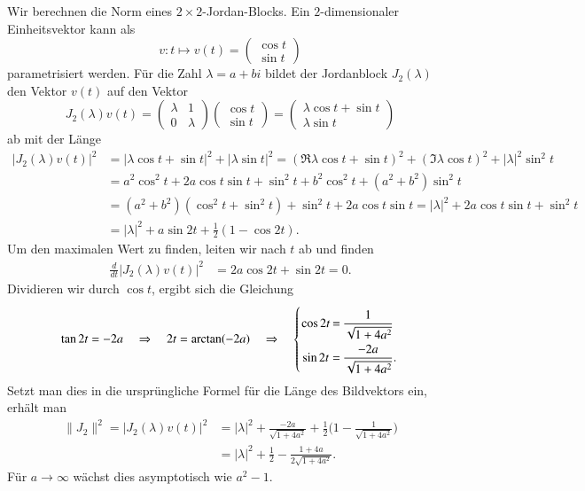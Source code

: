 \begin{beispiel}
Wir berechnen die Norm eines $2\times2$-Jordan-Blocks.
Ein $2$-dimensionaler Einheitsvektor kann als
\[
v\colon
t\mapsto v(t)=
\begin{pmatrix}\cos t\\\sin t\end{pmatrix}
\]
parametrisiert werden.
Für die Zahl $\lambda=a+bi$ bildet der
Jordanblock $J_2(\lambda)$ den Vektor $v(t)$ auf den Vektor
\[
J_2(\lambda)v(t)
=
\begin{pmatrix}
\lambda&1\\
0&\lambda
\end{pmatrix}
\begin{pmatrix}\cos t\\\sin t\end{pmatrix}
=
\begin{pmatrix}
\lambda\cos t + \sin t\\
\lambda\sin t
\end{pmatrix}
\]
ab
mit der Länge
\begin{align*}
|J_2(\lambda)v(t)|^2
&=
|\lambda\cos t + \sin t|^2 + |\lambda\sin t|^2
=
(\Re\lambda \cos t + \sin t)^2
+
(\Im\lambda \cos t)^2
+
|\lambda|^2 \sin^2t
\\
&=
a^2\cos^2 t
+
2a\cos t\sin t + \sin^2 t + b^2\cos^2t + (a^2+b^2) \sin^2 t
\\
&=
(a^2+b^2)(\cos^2t + \sin^2t) + \sin^2t + 2a\cos t\sin t
=
|\lambda|^2+2a\cos t\sin t + \sin^2 t
\\
&=
|\lambda|^2 + a\sin 2t + \frac12(1-\cos 2t).
\end{align*}
Um den maximalen Wert zu finden, leiten wir nach $t$ ab und finden
\begin{align*}
\frac{d}{dt}
|J_2(\lambda)v(t)|^2
&=
2a\cos 2t
+
\sin 2t
=
0.
\end{align*}
Dividieren wir durch $\cos t$, ergibt sich die Gleichung
\[
\tan 2t = -2a
\quad\Rightarrow\quad
2t
=
\arctan(-2a)
\quad\Rightarrow\quad
\left\{
\renewcommand{\arraystretch}{2.1}
\setlength\arraycolsep{1pt}
\begin{array}{ccc}
\cos 2t &=& \displaystyle\frac{1}{\sqrt{1+4a^2}}\phantom{.}\\
\sin 2t &=& \displaystyle\frac{-2a}{\sqrt{1+4a^2}}.
\end{array}
\right.
\]
Setzt man dies in die ursprüngliche Formel für die Länge des
Bildvektors ein, erhält man
\begin{align*}
\|J_2\|^2
=
|J_2(\lambda)v(t)|^2
&=
|\lambda|^2 + \frac{-2a}{\sqrt{1+4a^2}} + \frac12\biggl(1-\frac{1}{\sqrt{1+4a^2}}\biggr)
\\
&=
|\lambda|^2
+ \frac12
-\frac{1+4a}{2\sqrt{1+4a^2}}.
\end{align*}
Für $a\to\infty$ wächst dies asymptotisch wie $a^2-1$.
\end{beispiel}

